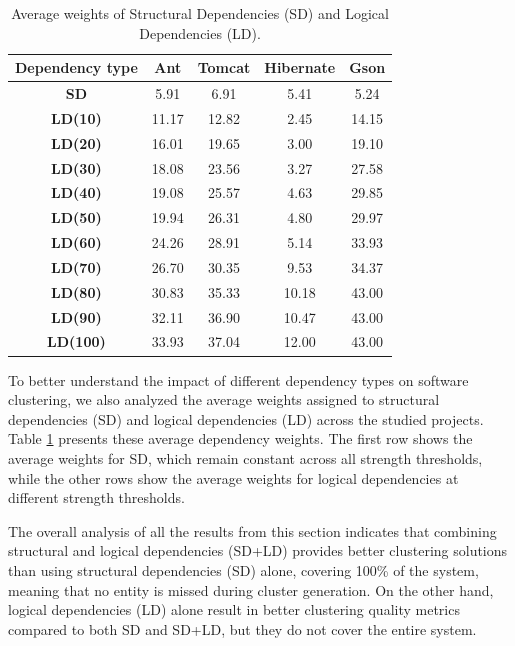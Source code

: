 \documentclass{ieeeaccess}
\begin{document}
\begin{table}[htbp]
\centering
\begin{tabular}{|c|c|c|c|c|}
\hline
\textbf{Dependency type} & \textbf{Ant} & \textbf{Tomcat} & \textbf{Hibernate} & \textbf{Gson} \\ \hline
\rowcolor[HTML]{ECECEC}\textbf{SD}     & 5.91  & 6.91  & 5.41  & 5.24  \\
\textbf{LD(10)} & 11.17 & 12.82 & 2.45  & 14.15 \\
\textbf{LD(20)} & 16.01 & 19.65 & 3.00  & 19.10 \\ 
\textbf{LD(30)} & 18.08 & 23.56 & 3.27  & 27.58 \\ 
\textbf{LD(40)} & 19.08 & 25.57 & 4.63  & 29.85 \\ 
\textbf{LD(50)} & 19.94 & 26.31 & 4.80  & 29.97 \\ 
\textbf{LD(60)} & 24.26 & 28.91 & 5.14  & 33.93 \\ 
\textbf{LD(70)} & 26.70 & 30.35 & 9.53  & 34.37 \\ 
\textbf{LD(80)} & 30.83 & 35.33 & 10.18 & 43.00 \\ 
\textbf{LD(90)} & 32.11 & 36.90 & 10.47 & 43.00 \\ 
\textbf{LD(100)} & 33.93 & 37.04 & 12.00 & 43.00 \\
 \hline
\end{tabular}
\caption{Average weights of Structural Dependencies (SD) and Logical Dependencies (LD).}
\label{tab:systems_weights}
\end{table}


To better understand the impact of different dependency types on software clustering, we also analyzed the average weights assigned to structural dependencies (SD) and logical dependencies (LD) across the studied projects. Table \ref{tab:systems_weights} presents these average dependency weights. The first row shows the average weights for SD, which remain constant across all strength thresholds, while the other rows show the average weights for logical dependencies at different strength thresholds.


The overall analysis of all the results from this section indicates that combining structural and logical dependencies (SD+LD) provides better clustering solutions than using structural dependencies (SD) alone, covering 100\% of the system, meaning that no entity is missed during cluster generation. On the other hand, logical dependencies (LD) alone result in better clustering quality metrics compared to both SD and SD+LD, but they do not cover the entire system.
\end{document}
